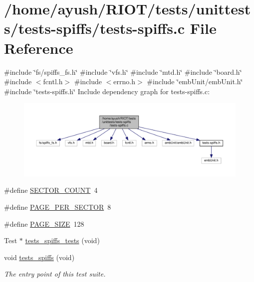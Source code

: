 \hypertarget{tests-spiffs_8c}{}\section{/home/ayush/\+R\+I\+O\+T/tests/unittests/tests-\/spiffs/tests-\/spiffs.c File Reference}
\label{tests-spiffs_8c}
{\ttfamily \#include \char`\"{}fs/spiffs\+\_\+fs.\+h\char`\"{}}\newline
{\ttfamily \#include \char`\"{}vfs.\+h\char`\"{}}\newline
{\ttfamily \#include \char`\"{}mtd.\+h\char`\"{}}\newline
{\ttfamily \#include \char`\"{}board.\+h\char`\"{}}\newline
{\ttfamily \#include $<$fcntl.\+h$>$}\newline
{\ttfamily \#include $<$errno.\+h$>$}\newline
{\ttfamily \#include \char`\"{}emb\+Unit/emb\+Unit.\+h\char`\"{}}\newline
{\ttfamily \#include \char`\"{}tests-\/spiffs.\+h\char`\"{}}\newline
Include dependency graph for tests-\/spiffs.c\+:
\nopagebreak
\begin{figure}[H]
\begin{center}
\leavevmode
\includegraphics[width=350pt]{tests-spiffs_8c__incl}
\end{center}
\end{figure}
\begin{DoxyCompactItemize}
\item 
\#define \hyperlink{tests-spiffs_8c_a2f4c02b9bb3a11b16f4f7dfec9333481}{S\+E\+C\+T\+O\+R\+\_\+\+C\+O\+U\+NT}~4
\item 
\#define \hyperlink{tests-spiffs_8c_a2494f21e4797c699def86fbbbd858fb1}{P\+A\+G\+E\+\_\+\+P\+E\+R\+\_\+\+S\+E\+C\+T\+OR}~8
\item 
\#define \hyperlink{tests-spiffs_8c_a7d467c1d283fdfa1f2081ba1e0d01b6e}{P\+A\+G\+E\+\_\+\+S\+I\+ZE}~128
\item 
Test $\ast$ \hyperlink{tests-spiffs_8c_ad92b2e5bdf15c38211974ac8676cf01f}{tests\+\_\+spiffs\+\_\+tests} (void)
\item 
void \hyperlink{group__unittests_ga80de15b6e1bf2cc394a940d69830d042}{tests\+\_\+spiffs} (void)
\begin{DoxyCompactList}\small\item\em The entry point of this test suite. \end{DoxyCompactList}\end{DoxyCompactItemize}


